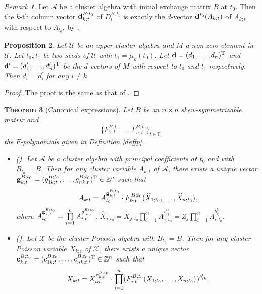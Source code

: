 \documentclass{amsart}
\newtheorem{theorem}{Theorem}[section]
\newtheorem{proposition}[theorem]{Proposition}
\theoremstyle{definition}
\theoremstyle{remark}
\newtheorem{remark}[theorem]{Remark}
\numberwithin{equation}{section}
\begin{document}
\begin{remark}
Let $\mathcal A$ be a cluster algebra with initial exchange matrix $B$ at $t_0$. Then the $k$-th column vector ${\bf d}_{k;t}^{B;t_0}$ of $D_{t}^{B;t_0}$ is exactly the $d$-vector ${\bf d}^{t_0}(A_{k;t})$ of  $A_{k;t}$ with respect to $A_{t_0}$, by \cite[(7.7)]{FZ3}.
\end{remark}


\begin{proposition}\label{prodvectors}
Let $\mathcal U$ be an  upper cluster algebra and $M$ a non-zero element in $\mathcal U$. Let $t_0, t_1$ be two seeds of $\mathcal U$ with $t_1=\mu_k(t_0)$. Let ${\bf d}=(d_1,\ldots,d_n)^{\rm T}$ and ${\bf d}^\prime=(d_1^\prime,\ldots,d_n^\prime)^{\rm T}$ be the $d$-vectors of $M$ with respect to $t_0$ and $t_1$ respectively.  Then $d_i=d_i^\prime$ for any $i\neq k$.
\end{proposition}
\begin{proof}
The proof is the same as that of \cite[Proposition 2.5]{RS}.
\end{proof}




\begin{theorem} [Canonical expressions]\label{thmsf}
Let $B$ be an $n\times n$ skew-symmetrizable matrix and  $$\{F_{1;t}^{B;t_0},\ldots,F_{n;t}^{B;t_0}\}_{t\in\mathbb T_n}$$  the $F$-polynomials given in Definition \ref{deffp}.
\begin{itemize}
 \item[(i)] {\rm (}\cite[Corollary 6.3]{FZ3}{\rm ).} Let $\mathcal A$  be a cluster algebra  with principal coefficients at $t_0$ and with $B_{t_0}=B$. Then for any cluster variable $A_{k;t}$ of $\mathcal A$, there exists a unique vector ${\bf g}_{k;t}^{B;t_0}=(g_{1k;t}^{B;t_0},\ldots,g_{nk;t}^{B;t_0})^{\rm T}\in \mathbb Z^n$ such that
\begin{eqnarray}\label{eqnsf}
A_{k;t}=A_{t_0}^{{\bf g}_{k;t}^{B;t_0}}\cdot F_{k;t}^{B;t_0}(\widehat X_{1;t_0},\ldots,\widehat X_{n;t_0}),\nonumber
\end{eqnarray}
where $A_{t_0}^{{\bf g}_{k;t}^{B;t_0}}=\prod\limits_{i=1}^nA_{i;t}^{g_{ik;t}^{B;t_0}}$, $\widehat X_{j;t_0}=X_{j;t_0}\prod\limits_{i=1}^nA_{i;t_0}^{b_{ij}^{t_0}}=Z_j\prod\limits_{i=1}^nA_{i;t_0}^{b_{ij}^{t_0}}$.
\item[(ii)] {\rm (}\cite[Proposition 1.1]{NZ}{\rm ).} Let $\mathcal X$  be the cluster Poisson algebra with  $B_{t_0}=B$. Then for any cluster Poisson variable $X_{k;t}$ of $\mathcal X$, there exists a unique vector ${\bf c}_{k;t}^{B;t_0}=(c_{1k;t}^{B;t_0},\ldots,c_{nk;t}^{B;t_0})^{\rm T}\in \mathbb Z^n$ such that
$$X_{k;t}=X_{t_0}^{{\bf c}_{k;t}^{B;t_0}}\cdot \prod\limits_{i=1}^n(F_{i;t}^{B;t_0}(X_{1;t_0},\ldots,X_{n;t_0}))^{b_{ik}^t}.$$
\end{itemize}
\end{theorem}
\end{document}
